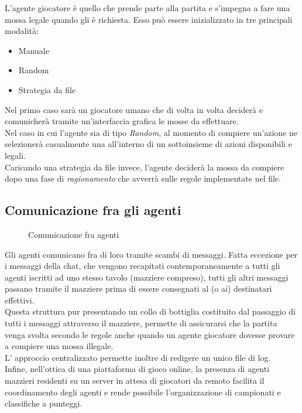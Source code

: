 L'agente giocatore è quello che prende parte alla partita e s'impegna a fare una mossa legale quando gli è richiesta.
Esso può essere inizializzato in tre principali modalità:
\begin{itemize}
   \item Manuale
   \item Random
   \item Strategia da file 
\end{itemize}
Nel primo caso sarà un giocatore umano che di volta in volta deciderà e comunicherà tramite un'interfaccia grafica le mosse da effettuare.\\
Nel caso in cui l'agente sia di tipo \emph{Random}, al momento di compiere un'azione ne selezionerà casualmente una all'interno di un sottoinsieme di azioni disponibili e legali.\\
Caricando una strategia da file invece, l'agente deciderà la mossa da compiere dopo una fase di \emph{ragionamento} che avverrà sulle regole implementate nel file.\\



\subsection{Comunicazione fra gli agenti}

\begin{figure}[!htb]
\centering
{}%
\hfill
{}%
\hfill
{}%
\caption{Comunicazione fra agenti} \label{fig:architettura}
\end{figure}

Gli agenti comunicano fra di loro tramite scambi di messaggi.
Fatta eccezione per i messaggi della chat, che vengono recapitati contemporaneamente a tutti gli agenti iscritti ad uno stesso tavolo (mazziere compreso), tutti gli altri messaggi passano tramite il mazziere prima di essere consegnati al (o ai) destinatari effettivi.\\
Questa struttura pur presentando un collo di bottiglia costituito dal passaggio di tutti i messaggi attraverso il mazziere, permette di assicurarsi che la partita venga svolta secondo le regole anche quando un agente giocatore dovesse provare a compiere una mossa illegale.\\
L' approccio centralizzato permette inoltre di redigere un unico file di log.\\
Infine, nell'ottica di una piattaforma di gioco online, la presenza di agenti mazzieri residenti su un server in attesa di giocatori da remoto facilita il coordinamento degli agenti e rende possibile l'organizzazione di campionati e classifiche a punteggi.\\

